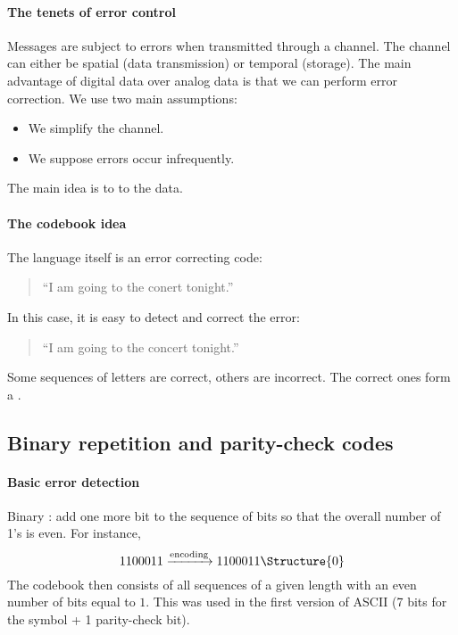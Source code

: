 \documentclass[a4paper, 11pt, openany]{book}
\begin{document}
\paragraph{The tenets of error control}
Messages are subject to errors when transmitted through a channel. The channel can either be spatial (data transmission) or temporal (storage).
The main advantage of digital data over analog data is that  we can perform error correction. We use two main assumptions:
\begin{itemize}
	\item We simplify the channel.

	\item We suppose errors occur infrequently.
\end{itemize}
The main idea is to  to the data.


\paragraph{The codebook idea}
The language itself is an error correcting code:
\begin{quote}
    ``I am going to the conert tonight.''\\
\end{quote}
In this case, it is easy to detect and correct the error:
\begin{quote}
    ``I am going to the concert tonight.''
\end{quote}
Some sequences of letters are correct, others are incorrect. The correct ones form a .


\subsection{Binary repetition and parity-check codes}

\paragraph{Basic error detection}
Binary : add one more bit to the sequence of bits so that the overall number of 1's is even. For instance,
\[
    1100011 \xrightarrow{\text{encoding}} 1100011\Structure{0}
\]
The codebook then consists of all sequences of a given length with an even number of bits equal to $1$. This was used in the first version of ASCII (7 bits for the symbol + 1 parity-check bit).
\end{document}

